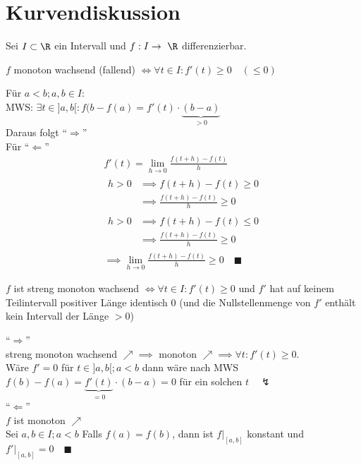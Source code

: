 \section{Kurvendiskussion}
Sei $I \subset \R$ ein Intervall und $f: I \rightarrow \R$ differenzierbar.\\
\begin{beh}
	$f$ monoton wachsend (fallend) $\iff \forall t \in I : f'(t) \geq 0 \quad (\leq 0)$\\
	\begin{bew}
		Für $a < b ; a, b \in I$:\\
		MWS: $\exists t \in ]a,b[ : f(b - f(a) = f'(t) \cdot \underbrace{(b-a)}_{>0}$\\
		Daraus folgt \enquote{$\Rightarrow$} \\
		Für \enquote{$\Leftarrow$}
		\begin{gather*}
			f'(t) = \lim_{h \rightarrow 0} \frac{f(t+h) - f(t)}{h} \\
			\begin{split}
				h > 0	&\implies f(t+h) - f(t) \geq 0 \\
					&\implies \frac{f(t+h) - f(t)}{h} \geq 0
			\end{split} \\
			\begin{split}
				h > 0	&\implies f(t+h) - f(t) \leq 0 \\
					&\implies \frac{f(t+h) - f(t)}{h} \geq 0
			\end{split} \\
			\implies \lim_{h \rightarrow 0} \frac{f(t+h) - f(t)}{h} \geq 0 \quad \blacksquare
		\end{gather*}
	\end{bew}
\end{beh}
\begin{beh}
	$f$ ist streng monoton wachsend $\iff \forall t \in I : f'(t) \geq 0$ und $f'$ hat auf keinem Teilintervall positiver Länge identisch $0$ (und die Nullstellenmenge von $f'$ enthält kein Intervall der Länge $> 0$) \\
	\begin{bew}
		\enquote{$\Rightarrow$} \\
		streng monoton wachsend $\nearrow \implies$ monoton $\nearrow \implies \forall t : f'(t) \geq 0$.\\
		Wäre $f' = 0$ für $t \in ]a,b[ ; a < b$ dann wäre nach MWS $f(b) - f(a) = \underbrace{f'(t)}_{=0} \cdot (b-a) = 0$ für ein solchen $t \quad \lightning$ \\
		\enquote{$\Leftarrow$} \\
		$f$ ist monoton $\nearrow$ \\
		Sei $a, b \in I ; a < b$ Falls $f(a) = f(b)$, dann ist $f|_{[a,b]}$ konstant und $f'|_{[a,b]} = 0 \quad \blacksquare$
	\end{bew}
\end{beh}
